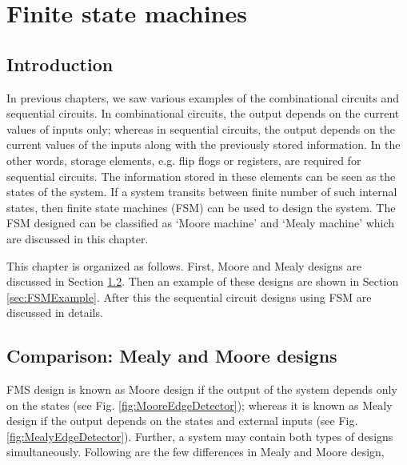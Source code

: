 \chapter{Finite state machines} \label{ch:FSM}

\graphicspath{{Chapters/FSM/Figures/}}


%

\section{Introduction}
In previous chapters, we saw various examples of the combinational circuits and sequential circuits. In combinational circuits, the output depends on the current values of inputs only; whereas in sequential circuits, the output depends on the current values of the inputs along with the previously stored information. In the other words, storage elements, e.g. flip flogs or registers, are required for sequential circuits. The information stored in these elements can be seen as the states of the system. If a system transits between finite number of such internal states, then finite state machines (FSM) can be used to design the system. The FSM designed can be classified as `Moore machine' and `Mealy machine' which are discussed in this chapter.  

This chapter is organized as follows. First, Moore and Mealy designs are discussed in Section \ref{sec:MealyMooreDesign}. Then an example of these designs are shown in Section \ref{sec:FSMExample}. After this the sequential circuit designs using FSM are discussed in details. 

\section{Comparison: Mealy and Moore designs}\label{sec:MealyMooreDesign}
FMS design is known as Moore design if the output of the system depends only on the states (see Fig. \ref{fig:MooreEdgeDetector}); whereas it is known as Mealy design if the output depends on the states and external inputs (see Fig. \ref{fig:MealyEdgeDetector}). Further, a system may contain both types of designs simultaneously. Following are the few differences in Mealy and Moore design, 



